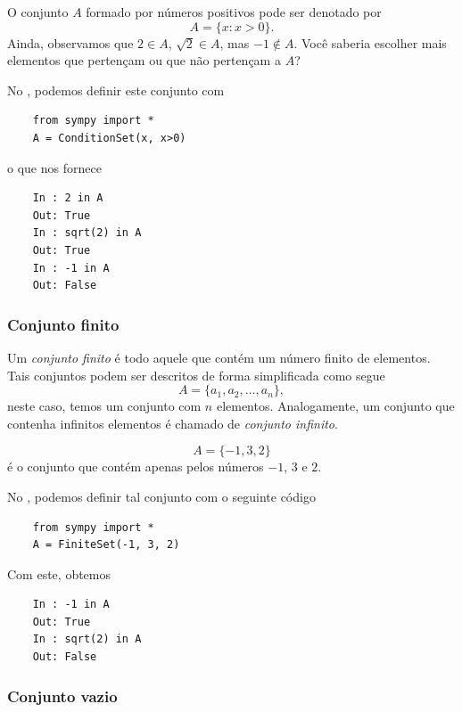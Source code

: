 \begin{ex}
  O conjunto $A$ formado por números positivos pode ser denotado por
  \begin{equation}
    A = \{x: x>0\}.
  \end{equation}
  Ainda, observamos que $2\in A$, $\sqrt{2}\in A$, mas $-1\not\in A$. Você saberia escolher mais elementos que pertençam ou que não pertençam a $A$?

  \ifispython
  No \python, podemos definir este conjunto com
  \begin{lstlisting}
    from sympy import *
    A = ConditionSet(x, x>0)
  \end{lstlisting}
  o que nos fornece
  \begin{lstlisting}
    In : 2 in A
    Out: True
    In : sqrt(2) in A
    Out: True
    In : -1 in A
    Out: False
  \end{lstlisting}
  \fi
\end{ex}

\subsubsection{Conjunto finito}

Um \emph{conjunto finito} é todo aquele que contém um número finito de elementos. Tais conjuntos podem ser descritos de forma simplificada como segue
\begin{equation}
  A = \{a_1, a_2, \ldots, a_n\},
\end{equation}
neste caso, temos um conjunto com $n$ elementos. Analogamente, um conjunto que contenha infinitos elementos é chamado de \emph{conjunto infinito}.

\begin{obs}
  \begin{equation}
    A = \{-1,3,2\}
  \end{equation}
  é o conjunto que contém apenas pelos números $-1$, $3$ e $2$.

  \ifispython
  No \python, podemos definir tal conjunto com o seguinte código
  \begin{lstlisting}
    from sympy import *
    A = FiniteSet(-1, 3, 2)
  \end{lstlisting}
  Com este, obtemos
  \begin{lstlisting}
    In : -1 in A
    Out: True
    In : sqrt(2) in A
    Out: False
  \end{lstlisting}
  \fi
\end{obs}

\subsubsection{Conjunto vazio}

